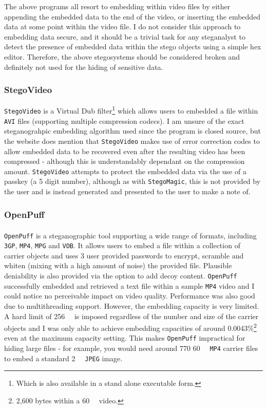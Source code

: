 \documentclass[paper=a4, fontsize=11pt,twoside]{scrartcl}
\numberwithin{table}{section}
\numberwithin{figure}{section}
\numberwithin{algorithm}{section}
\begin{document}
\noindent
The above programs all resort to embedding within video files by either appending the embedded data to the end of the video, or inserting the embedded data at some point within the video file. I do not consider this approach to embedding data secure, and it should be a trivial task for any steganalyst to detect the presence of embedded data within the stego objects using a simple hex editor. Therefore, the above stegosystems should be considered broken and definitely not used for the hiding of sensitive data.

\subsubsection{StegoVideo}

\texttt{StegoVideo}\textsuperscript{\cite{stegovideo}} is a Virtual Dub filter\footnote{Which is also available in a stand alone executable form.} which allows users to embedded a file within \texttt{AVI} files (supporting multiple compression codecs). I am unsure of the exact steganograhpic embedding algorithm used since the program is closed source, but the website does mention that \texttt{StegoVideo} makes use of error correction codes to allow embedded data to be recovered even after the resulting video has been compressed - although this is understandably dependant on the compression amount. \texttt{StegoVideo} attempts to protect the embedded data via the use of a passkey (a 5 digit number), although as with \texttt{StegoMagic}, this is not provided by the user and is instead generated and presented to the user to make a note of.

\subsubsection{OpenPuff}

\texttt{OpenPuff}\textsuperscript{\cite{openpuff}} is a steganographic tool supporting a wide range of formats, including \texttt{3GP}, \texttt{MP4}, \texttt{MPG} and \texttt{VOB}. It allows users to embed a file within a collection of carrier objects and uses 3 user provided passwords to encrypt, scramble and whiten (mixing with a high amount of noise) the provided file. Plausible deniability is also provided via the option to add decoy content. \texttt{OpenPuff} successfully embedded and retrieved a text file within a sample \texttt{MP4} video and I could notice no perceivable impact on video quality. Performance was also good due to multithreading support. However, the embedding capacity is very limited. A hard limit of \SI{256}{\mega\byte} is imposed regardless of the number and size of the carrier objects and I was only able to achieve embedding capacities of around 0.0043\%\footnote{2,600 bytes within a \SI{60}{\mega\byte} video.} even at the maximum capacity setting. This makes \texttt{OpenPuff} impractical for hiding large files - for example, you would need around 770 \SI{60}{\mega\byte} \texttt{MP4} carrier files to embed a standard \SI{2}{\mega\byte} \texttt{JPEG} image.
\end{document}
